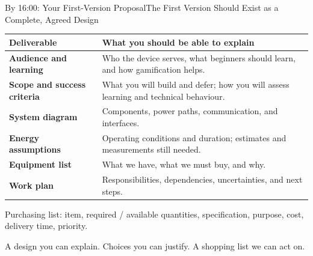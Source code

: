 \begin{frame}{By 16:00: Your First-Version Proposal}{The First Version Should Exist as a Complete, Agreed Design}
\small\renewcommand{\arraystretch}{1.25}
\par\noindent\begin{tabularx}{\textwidth}{@{}>{\raggedright\arraybackslash}p{}>{\raggedright\arraybackslash}X@{}}
\toprule
\textbf{Deliverable} & \textbf{What you should be able to explain}\\\midrule
\textbf{Audience and learning} & Who the device serves, what beginners should learn, and how gamification helps.\\
\textbf{Scope and success criteria} & What you will build and defer; how you will assess learning and technical behaviour.\\
\textbf{System diagram} & Components, power paths, communication, and interfaces.\\
\textbf{Energy assumptions} & Operating conditions and duration; estimates and measurements still needed.\\
\textbf{\color{fh-ooe-red}Equipment list} & What we have, what we must buy, and why.\\
\textbf{Work plan} & Responsibilities, dependencies, uncertainties, and next steps.\\\bottomrule
\end{tabularx}\par
\vspace{.5em}
\footnotesize Purchasing list: item, required / available quantities, specification, purpose, cost, delivery time, priority.\par
\vspace{.5em}
\normalsize\alert{A design you can explain. Choices you can justify. A shopping list we can act on.}
\end{frame}
\endgroup

